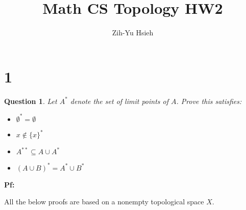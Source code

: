 \documentclass{article}
\title{Math CS Topology HW2}
\author{Zih-Yu Hsieh}
\newtheorem{question}{Question}
\begin{document}
\maketitle

\section*{1}
\begin{myBox}[]{}
    \begin{question}
        Let $A^*$ denote the set of limit points of $A$. Prove this satisfies:
        \begin{itemize}
            \item $\emptyset^*=\emptyset$
            \item $x\notin \{x\}^*$
            \item $A^{**}\subseteq A\cup A^*$
            \item $(A\cup B)^*=A^*\cup B^*$
        \end{itemize}
    \end{question}
\end{myBox}

\textbf{Pf:}

All the below proofs are based on a nonempty topological space $X$.
\end{document}
